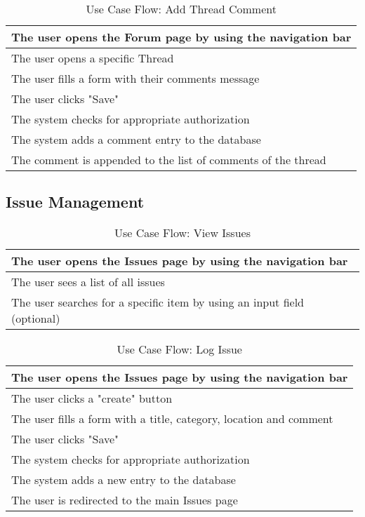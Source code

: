   \begin{table}[H]
    \begin{tabularx}{\linewidth}{|X|}
      \hline
       The user opens the Forum page by using the navigation bar \\
       \hline
       The user opens a specific Thread \\
       \hline
       The user fills a form with their comments message \\
       \hline
       The user clicks "Save" \\
       \hline
       The system checks for appropriate authorization \\
       \hline
       The system adds a comment entry to the database \\
       \hline
       The comment is appended to the list of comments of the thread \\
       \hline 
    \end{tabularx}
    \caption{Use Case Flow: Add Thread Comment}
  \end{table}

\subsection{Issue Management}
\begin{table}[H]
  \begin{tabularx}{\linewidth}{|X|}
    \hline
     The user opens the Issues page by using the navigation bar \\
     \hline
     The user sees a list of all issues \\
     \hline
     The user searches for a specific item by using an input field (optional) \\
     \hline 
  \end{tabularx}
  \caption{Use Case Flow: View Issues}
\end{table}

\begin{table}[H]
    \begin{tabularx}{\linewidth}{|X|}
      \hline
       The user opens the Issues page by using the navigation bar \\
       \hline
       The user clicks a "create" button \\
       \hline
       The user fills a form with a title, category, location and comment \\
       \hline
       The user clicks "Save" \\
       \hline
       The system checks for appropriate authorization \\
       \hline
       The system adds a new entry to the database \\
       \hline
       The user is redirected to the main Issues page \\
       \hline 
    \end{tabularx}
    \caption{Use Case Flow: Log Issue}
  \end{table}

